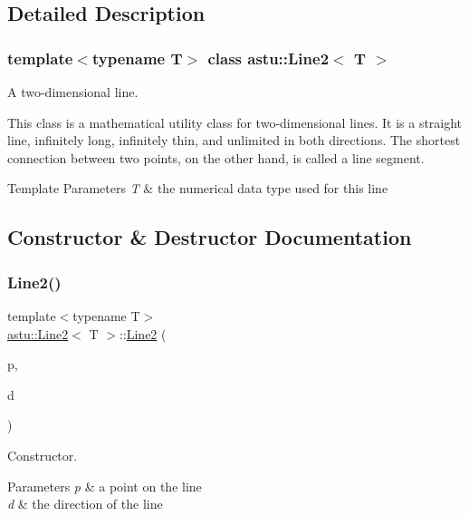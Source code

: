 \subsection{Detailed Description}
\subsubsection*{template$<$typename T$>$\newline
class astu\+::\+Line2$<$ T $>$}

A two-\/dimensional line.

This class is a mathematical utility class for two-\/dimensional lines. It is a straight line, infinitely long, infinitely thin, and unlimited in both directions. The shortest connection between two points, on the other hand, is called a line segment.


\begin{DoxyTemplParams}{Template Parameters}
{\em T} & the numerical data type used for this line \\
\hline
\end{DoxyTemplParams}


\subsection{Constructor \& Destructor Documentation}
\mbox{\label{classastu_1_1Line2_a72fd313c61c33e1560003636081fbccc}} 
\subsubsection{\texorpdfstring{Line2()}{Line2()}}
{\footnotesize\ttfamily template$<$typename T$>$ \\
\hyperlink{classastu_1_1Line2}{astu\+::\+Line2}$<$ T $>$\+::\hyperlink{classastu_1_1Line2}{Line2} (\begin{DoxyParamCaption}\item[{const \hyperlink{classastu_1_1Vector2}{Vector2}$<$ T $>$ \&}]{p,  }\item[{const \hyperlink{classastu_1_1Vector2}{Vector2}$<$ T $>$ \&}]{d }\end{DoxyParamCaption})\hspace{0.3cm}{\ttfamily [inline]}}

Constructor.


\begin{DoxyParams}{Parameters}
{\em p} & a point on the line \\
\hline
{\em d} & the direction of the line \\
\hline
\end{DoxyParams}


